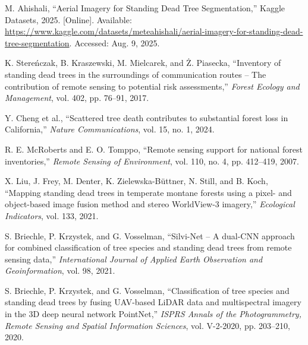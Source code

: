 
\begin{thebibliography}{00}

 M. Ahishali, ``Aerial Imagery for Standing Dead Tree Segmentation,'' Kaggle Datasets, 2025. [Online]. Available: \url{https://www.kaggle.com/datasets/meteahishali/aerial-imagery-for-standing-dead-tree-segmentation}. Accessed: Aug. 9, 2025.

 K. Stereńczak, B. Kraszewski, M. Mielcarek, and Ż. Piasecka, ``Inventory of standing dead trees in the surroundings of communication routes -- The contribution of remote sensing to potential risk assessments,'' \textit{Forest Ecology and Management}, vol. 402, pp. 76--91, 2017.

 Y. Cheng et al., ``Scattered tree death contributes to substantial forest loss in California,'' \textit{Nature Communications}, vol. 15, no. 1, 2024.

 R. E. McRoberts and E. O. Tomppo, ``Remote sensing support for national forest inventories,'' \textit{Remote Sensing of Environment}, vol. 110, no. 4, pp. 412--419, 2007.

 X. Liu, J. Frey, M. Denter, K. Zielewska-Büttner, N. Still, and B. Koch, ``Mapping standing dead trees in temperate montane forests using a pixel- and object-based image fusion method and stereo WorldView-3 imagery,'' \textit{Ecological Indicators}, vol. 133, 2021.

 S. Briechle, P. Krzystek, and G. Vosselman, ``Silvi-Net -- A dual-CNN approach for combined classification of tree species and standing dead trees from remote sensing data,'' \textit{International Journal of Applied Earth Observation and Geoinformation}, vol. 98, 2021.

 S. Briechle, P. Krzystek, and G. Vosselman, ``Classification of tree species and standing dead trees by fusing UAV-based LiDAR data and multispectral imagery in the 3D deep neural network PointNet,'' \textit{ISPRS Annals of the Photogrammetry, Remote Sensing and Spatial Information Sciences}, vol. V-2-2020, pp. 203--210, 2020.


\end{thebibliography}
